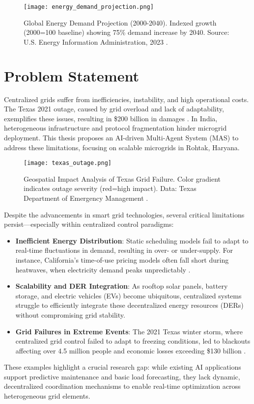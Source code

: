 \documentclass[12pt]{report}
\begin{document}
\begin{figure}[h]
    \centering
    \texttt{[image: energy\_demand\_projection.png]}
    \caption{Global Energy Demand Projection (2000-2040). Indexed growth (2000=100 baseline) showing 75\% demand increase by 2040. Source: U.S. Energy Information Administration, 2023 \cite{EIA2023}.}
    \label{fig:energy_demand}
\end{figure}

\section{Problem Statement}
\begin{doublespace}
Centralized grids suffer from inefficiencies, instability, and high operational costs. The Texas 2021 outage, caused by grid overload and lack of adaptability, exemplifies these issues, resulting in \$200 billion in damages \cite{ERCOT2021}. In India, heterogeneous infrastructure and protocol fragmentation hinder microgrid deployment. This thesis proposes an AI-driven Multi-Agent System (MAS) to address these limitations, focusing on scalable microgrids in Rohtak, Haryana.
\begin{figure}[h]
    \centering
    \texttt{[image: texas\_outage.png]}
    \caption{Geospatial Impact Analysis of Texas Grid Failure. Color gradient indicates outage severity (red=high impact). Data: Texas Department of Emergency Management \cite{Texas2021}.}
    \label{fig:texas_outage}
\end{figure}
Despite the advancements in smart grid technologies, several critical limitations persist—especially within centralized control paradigms:
\begin{itemize}
    \item \textbf{Inefficient Energy Distribution}: Static scheduling models fail to adapt to real-time fluctuations in demand, resulting in over- or under-supply. For instance, California’s time-of-use pricing models often fall short during heatwaves, when electricity demand peaks unpredictably \cite{California2020}.
    \item \textbf{Scalability and DER Integration}: As rooftop solar panels, battery storage, and electric vehicles (EVs) become ubiquitous, centralized systems struggle to efficiently integrate these decentralized energy resources (DERs) without compromising grid stability.
    \item \textbf{Grid Failures in Extreme Events}: The 2021 Texas winter storm, where centralized grid control failed to adapt to freezing conditions, led to blackouts affecting over 4.5 million people and economic losses exceeding \$130 billion \cite{ERCOT2021}.
\end{itemize}
These examples highlight a crucial research gap: while existing AI applications support predictive maintenance and basic load forecasting, they lack dynamic, decentralized coordination mechanisms to enable real-time optimization across heterogeneous grid elements.
\end{doublespace}
\end{document}
